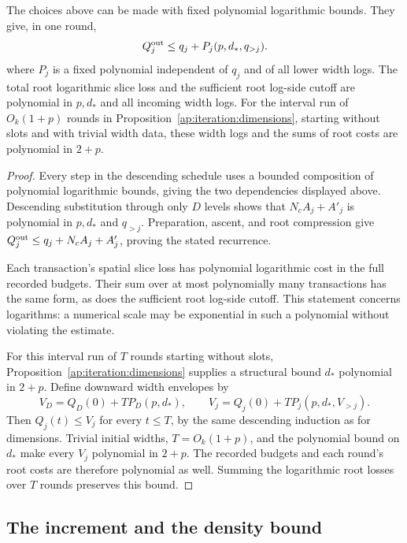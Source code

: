 \begin{proposition}
\label{ap:iteration:widths}
The choices above can be made with fixed polynomial logarithmic bounds.
They give, in one round,
\begin{equation}\label{ap:iteration:width-rec}
 Q_j^{\rm out}\le q_j+P_j(p,d_*,q_{>j}).
\end{equation}
where $P_j$ is a fixed polynomial independent of $q_j$ and of all lower
width logs.  The total root logarithmic slice loss and the sufficient
root log-side cutoff are polynomial in $p,d_*$ and all incoming width
logs.  For the interval run of $O_k(1+p)$ rounds in
Proposition~\ref{ap:iteration:dimensions}, starting without slots and
with trivial width data, these width logs and the sums of root costs
are polynomial in $2+p$.
\end{proposition}

\begin{proof}
Every step in the descending schedule uses a bounded composition of
polynomial logarithmic bounds, giving the two dependencies displayed
above.  Descending substitution through only $D$ levels shows that
$N_c A_j+A'_j$ is polynomial in $p,d_*$ and
$q_{>j}$.  Preparation, ascent, and root compression give
$Q_j^{\rm out}\le q_j+N_c A_j+A'_j$, proving the stated recurrence.

Each transaction's spatial slice loss has polynomial logarithmic cost
in the full recorded budgets.  Their sum over at most polynomially many
transactions has the same form, as does the sufficient root log-side
cutoff.  This statement concerns logarithms: a numerical scale may be
exponential in such a polynomial without violating the estimate.

For this interval run of $T$ rounds starting without slots,
Proposition~\ref{ap:iteration:dimensions} supplies a structural bound
$d_*$ polynomial in $2+p$.  Define downward width envelopes by
\[
 V_D=Q_D(0)+T P_D(p,d_*),\qquad
 V_j=Q_j(0)+T P_j(p,d_*,V_{>j}).
\]
Then $Q_j(t)\le V_j$ for every $t\le T$, by the same descending
induction as for dimensions.  Trivial initial widths, $T=O_k(1+p)$,
and the polynomial bound on $d_*$ make every $V_j$ polynomial in
$2+p$.  The recorded budgets and each
round's root costs are therefore polynomial as well.  Summing the
logarithmic root losses over $T$ rounds preserves this bound.
\end{proof}

\subsection{The increment and the density bound}

